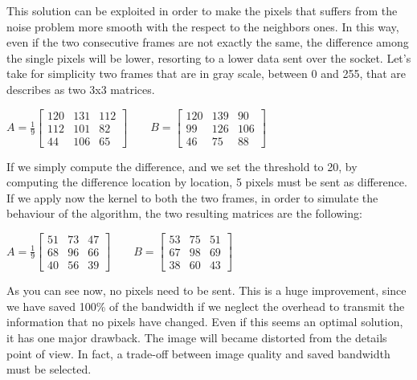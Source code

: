 \documentclass[paper=a4, fontsize=10pt]{scrartcl}	%
\begin{document}
	This solution can be exploited in order to make the pixels that suffers from the noise problem more smooth with the respect to the neighbors ones. In this way, even if the two consecutive frames are not exactly the same, the difference among the single pixels will be lower, resorting to a lower data sent over the socket. Let's take for simplicity two frames that are in gray scale, between 0 and 255, that are describes as two 3x3 matrices.
	\begin{center}
		$
		A = \frac{1}{9}\begin{bmatrix}
		120 & 131 & 112\\
			112 & 101 & 82\\
			44 & 106 & 65
		\end{bmatrix}
	\quad\quad B = \begin{bmatrix}
			120 & 139 & 90\\
			99 & 126 & 106\\
			46 & 75 & 88
		\end{bmatrix}
		$
	\end{center}
	If we simply compute the difference, and we set the threshold to 20, by computing the difference location by location, 5 pixels must be sent as difference. If we apply now the kernel to both the two frames, in order to simulate the behaviour of the algorithm, the two resulting matrices are the following:
	\begin{center}
		$
		A = \frac{1}{9}\begin{bmatrix}
			51 & 73 & 47\\
			68 & 96 & 66\\
			40 & 56 & 39
		\end{bmatrix}
		\quad\quad B = \begin{bmatrix}
			53 & 75 & 51\\
			67 & 98 & 69\\
			38 & 60 & 43
		\end{bmatrix}
		$
	\end{center}
	As you can see now, no pixels need to be sent. This is a huge improvement, since we have saved 100\% of the bandwidth if we neglect the overhead to transmit the information that no pixels have changed. Even if this seems an optimal solution, it has one major drawback. The image will became distorted from the details point of view. In fact, a trade-off between image quality and saved bandwidth must be selected.
\end{document}
